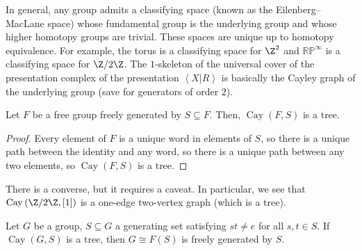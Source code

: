 \documentclass[10pt]{mypackage}
\begin{document}
In general, any group admits a classifying space (known as the Eilenberg--MacLane space) whose fundamental group is the underlying group and whose higher homotopy groups are trivial. These spaces are unique up to homotopy equivalence. For example, the torus is a classifying space for $\Z^2$ and $ \mathbb{RP}^{\infty} $ is a classifying space for $\Z/2\Z$. The $1$-skeleton of the universal cover of the presentation complex of the presentation $ \left\langle X|R \right\rangle $ is basically the Cayley graph of the underlying group (save for generators of order $2$).
\begin{theorem}
  Let $F$ be a free group freely generated by $S\subseteq F$. Then, $ \operatorname{Cay}\left( F,S \right) $ is a tree.
\end{theorem}
\begin{proof}
  Every element of $F$ is a unique word in elements of $S$, so there is a unique path between the identity and any word, so there is a unique path between any two elements, so $ \operatorname{Cay}\left( F,S \right) $ is a tree.
\end{proof}
There is a converse, but it requires a caveat. In particular, we see that $ \operatorname{Cay}\left( \Z/2\Z,[1] \right) $ is a one-edge two-vertex graph (which is a tree). 
\begin{theorem}
  Let $G$ be a group, $S\subseteq G$ a generating set satisfying $st\neq e$ for all $s,t\in S$. If $\operatorname{Cay}\left( G,S \right)$ is a tree, then $G \cong F(S)$ is freely generated by $S$.
\end{theorem}
\end{document}
